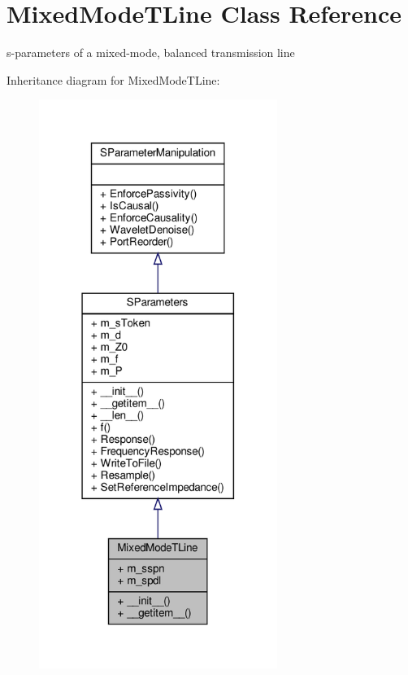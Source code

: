 \hypertarget{classSignalIntegrity_1_1SParameters_1_1Devices_1_1MixedModeTline_1_1MixedModeTLine}{}\section{Mixed\+Mode\+T\+Line Class Reference}
\label{classSignalIntegrity_1_1SParameters_1_1Devices_1_1MixedModeTline_1_1MixedModeTLine}


s-\/parameters of a mixed-\/mode, balanced transmission line  




Inheritance diagram for Mixed\+Mode\+T\+Line\+:\nopagebreak
\begin{figure}[H]
\begin{center}
\leavevmode
\includegraphics[width=220pt]{classSignalIntegrity_1_1SParameters_1_1Devices_1_1MixedModeTline_1_1MixedModeTLine__inherit__graph}
\end{center}
\end{figure}



